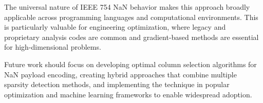 \documentclass{article}
\begin{document}
The universal nature of IEEE 754 NaN behavior makes this approach broadly applicable across programming languages and computational environments. This is particularly valuable for engineering optimization, where legacy and proprietary analysis codes are common and gradient-based methods are essential for high-dimensional problems.

Future work should focus on developing optimal column selection algorithms for NaN payload encoding, creating hybrid approaches that combine multiple sparsity detection methods, and implementing the technique in popular optimization and machine learning frameworks to enable widespread adoption.



\end{document}
